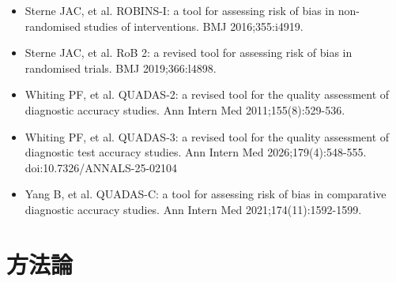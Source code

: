 \begin{itemize}
\item Sterne JAC, et al. ROBINS-I: a tool for assessing risk of bias in non-randomised studies of interventions. BMJ 2016;355:i4919.
\item Sterne JAC, et al. RoB 2: a revised tool for assessing risk of bias in randomised trials. BMJ 2019;366:l4898.
\item Whiting PF, et al. QUADAS-2: a revised tool for the quality assessment of diagnostic accuracy studies. Ann Intern Med 2011;155(8):529-536.
\item Whiting PF, et al. QUADAS-3: a revised tool for the quality assessment of diagnostic test accuracy studies. Ann Intern Med 2026;179(4):548-555. doi:10.7326/ANNALS-25-02104
\item Yang B, et al. QUADAS-C: a tool for assessing risk of bias in comparative diagnostic accuracy studies. Ann Intern Med 2021;174(11):1592-1599.
\end{itemize}

\section{方法論}
\label{sec:C-3}

